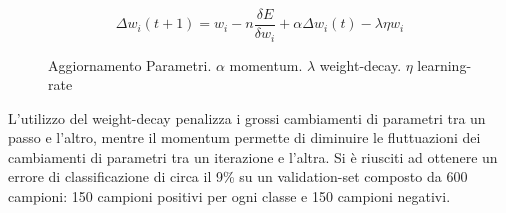 \begin{figure}[h!b]
\centering
  
  \[\Delta w_i(t+1)=w_i-n\frac{\delta E}{\delta w_i}+\alpha \Delta w_i(t) -\lambda \eta w_i \]
  \caption{Aggiornamento Parametri. ${\alpha}$  momentum. ${\lambda}$ weight-decay. ${\eta}$ learning-rate}
\end{figure}
 
L'utilizzo del weight-decay penalizza i grossi cambiamenti di parametri tra un passo e l'altro, mentre il momentum permette di diminuire le fluttuazioni dei cambiamenti di parametri tra un iterazione e l'altra. Si è riusciti ad ottenere un errore di classificazione di circa il 9\% su un validation-set composto da 600 campioni: 150 campioni positivi per ogni classe e 150 campioni negativi.
 
 
 
 